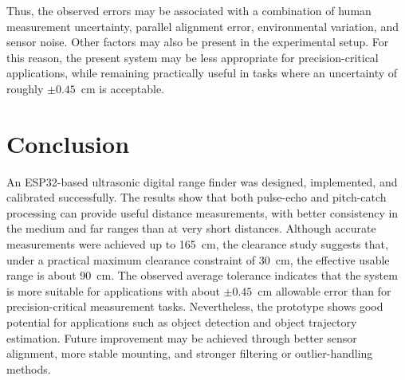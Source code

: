 \documentclass[10pt, conference, compsocconf]{IEEEtran}
\begin{document}
Thus, the observed errors may be associated with a combination of human
measurement uncertainty, parallel alignment error, environmental
variation, and sensor noise. Other factors may also be present in the
experimental setup. For this reason, the present system may be less
appropriate for precision-critical applications, while remaining
practically useful in tasks where an uncertainty of roughly
$\pm 0.45$~cm is acceptable.

\section{Conclusion}
An ESP32-based ultrasonic digital range finder was designed,
implemented, and calibrated successfully. The results show that both
pulse-echo and pitch-catch processing can provide useful distance
measurements, with better consistency in the medium and far ranges than
at very short distances. Although accurate measurements were achieved up to
165~cm, the clearance study suggests that, under a practical maximum
clearance constraint of 30~cm, the effective usable range is about
90~cm. The observed average tolerance indicates that the system is more
suitable for applications with about $\pm 0.45$~cm allowable error than
for precision-critical measurement tasks. Nevertheless, the prototype
shows good potential for applications such as object detection and
object trajectory estimation. Future improvement may be achieved
through better sensor alignment, more stable mounting, and stronger
filtering or outlier-handling methods.
\end{document}
